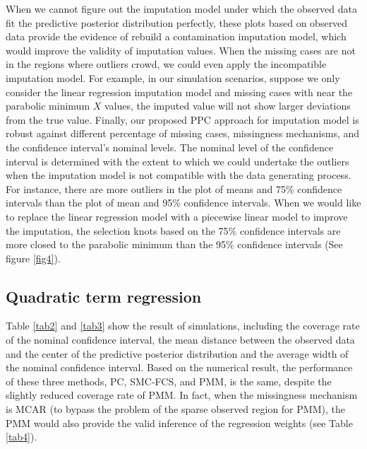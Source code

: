 \documentclass[12pt, fullpage, a4paper]{article}
\begin{document}
When we cannot figure out the imputation model under which the observed data fit the predictive posterior distribution perfectly, these plots based on observed data provide the evidence of rebuild a contamination imputation model, which would improve the validity of imputation values. When the missing cases are not in the regions where outliers crowd, we could even apply the incompatible imputation model. For example, in our simulation scenarios, suppose we only consider the linear regression imputation model and missing cases with near the parabolic minimum $X$ values, the imputed value will not show larger deviations from the true value. Finally, our proposed PPC approach for imputation model is robust against different percentage of missing cases, missingness mechanisms, and the confidence interval's nominal levels. The nominal level of the confidence interval is determined with the extent to which we could undertake the outliers when the imputation model is not compatible with the data generating process. For instance, there are more outliers in the plot of means and 75\% confidence intervals than the plot of mean and 95\% confidence intervals. When we would like to replace the linear regression model with a piecewise linear model to improve the imputation, the selection knots based on the 75\% confidence intervals are more closed to the parabolic minimum than the 95\% confidence intervals (See figure \ref{fig4}). 

\subsection{Quadratic term regression}
Table \ref{tab2} and \ref{tab3} show the result of simulations, including the coverage rate of the nominal confidence interval, the mean distance between the observed data and the center of the predictive posterior distribution and the average width of the nominal confidence interval. Based on the numerical result, the performance of these three methods, PC, SMC-FCS, and PMM, is the same, despite the slightly reduced coverage rate of PMM. In fact, when the missingness mechanism is MCAR (to bypass the problem of the sparse observed region for PMM), the PMM would also provide the valid inference of the regression weights (see Table \ref{tab4}).
\end{document}
